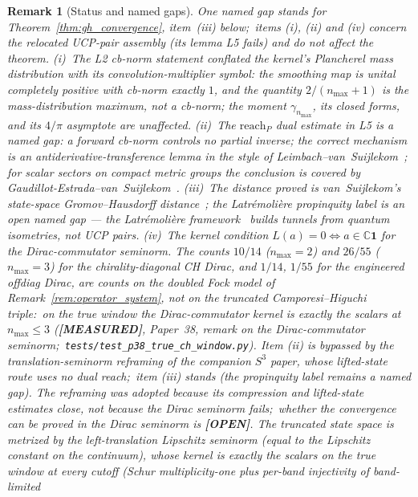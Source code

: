 \documentclass[11pt]{article}
\newtheorem{remark}{Remark}
\begin{document}
\begin{remark}[Status and named gaps]
\label{rem:gh_status_caveat}
One named gap stands for Theorem~\ref{thm:gh_convergence}, item~(iii)
below;\ items (i), (ii) and (iv) concern the relocated UCP-pair assembly
(its lemma L5 fails) and do not affect the theorem.
(i)~The L2 cb-norm statement conflated the kernel's Plancherel
\emph{mass distribution} with its convolution-\emph{multiplier symbol}:
the smoothing map is unital completely positive with cb-norm exactly
$1$, and the quantity $2/(n_{\max}+1)$ is the mass-distribution maximum,
not a cb-norm; the moment $\gamma_{n_{\max}}$, its closed forms, and
its $4/\pi$ asymptote are unaffected.  (ii)~The $\mathrm{reach}_P$ dual estimate in L5 is a
\emph{named gap}: a forward cb-norm controls no partial inverse; the
correct mechanism is an antiderivative-transference lemma in the style
of Leimbach--van~Suijlekom~\cite{leimbach_vs2024};
for scalar sectors on compact metric groups the conclusion is covered by
Gaudillot-Estrada--van~Suijlekom~\cite{gaudillot_estrada_vs2025}.
(iii)~The distance proved is van~Suijlekom's state-space
Gromov--Hausdorff distance~\cite{vansuijlekom2021_fejer}; the
Latr{\'e}moli{\`e}re propinquity label is an open named gap --- the
Latr{\'e}moli{\`e}re framework~\cite{latremoliere2021dual} builds tunnels from quantum
isometries, not UCP pairs.
(iv)~The kernel condition $L(a) = 0 \iff a \in \mathbb{C}\mathbf{1}$
for the Dirac-commutator seminorm.  The counts $10/14$ ($n_{\max} = 2$)
and $26/55$ ($n_{\max} = 3$) for the chirality-diagonal CH Dirac, and
$1/14$, $1/55$ for the engineered offdiag Dirac, are counts on the
\emph{doubled Fock model} of Remark~\ref{rem:operator_system}, not on the
truncated Camporesi--Higuchi triple:\ on the true window the
Dirac-commutator kernel is exactly the scalars at $n_{\max} \le 3$
(\textbf{[MEASURED]}, Paper~38, remark on the Dirac-commutator seminorm;\
\texttt{tests/test\_p38\_true\_ch\_window.py}).  Item (ii) is bypassed
by the translation-seminorm reframing of the companion
$S^3$ paper, whose lifted-state route uses no dual reach;\ item (iii)
stands (the propinquity label remains a named gap).  The reframing was
adopted because its compression and lifted-state
estimates close, not because the Dirac seminorm fails;\ whether the
convergence can be proved in the Dirac seminorm is \textbf{[OPEN]}.  The
truncated state space is metrized by the left-translation Lipschitz
seminorm (equal to the Lipschitz constant on the continuum), whose
kernel is exactly the scalars on the true window at every cutoff
(Schur multiplicity-one plus per-band injectivity of band-limited

\end{remark}
\end{document}
